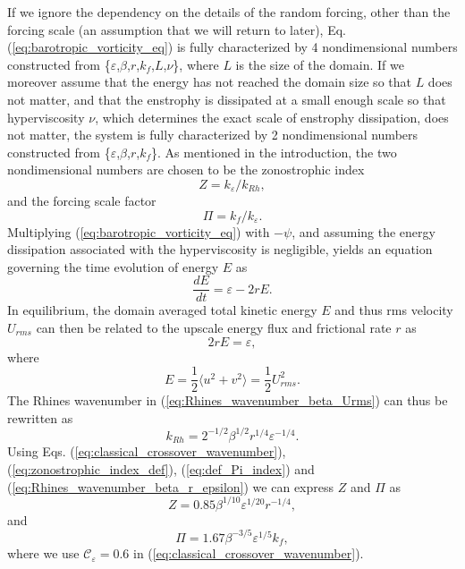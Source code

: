 \documentclass{jfm}
\begin{document}
If we ignore the dependency on the details of the random forcing, other than the forcing scale 
(an assumption that we will return to later), Eq. (\ref{eq:barotropic_vorticity_eq})
is fully characterized by 4 nondimensional
numbers constructed from \{$\varepsilon$,$\beta$,$r$,$k_{f}$,$L$,$\nu$\},
where $L$ is the size of the domain. If we moreover assume that the energy has
not reached the domain size so that $L$ does not matter, and that the
enstrophy is dissipated at a small enough scale so that hyperviscosity
$\nu$, which determines the exact scale of enstrophy dissipation,
does not matter, the system is fully characterized
by 2 nondimensional numbers constructed from \{$\varepsilon$,$\beta$,$r$,$k_{f}$\}.
As mentioned in the introduction, the two nondimensional numbers
are chosen to be the zonostrophic index 
\[
Z=k_{\varepsilon}/k_{Rh},
\]
and the forcing scale factor
\[
\Pi=k_{f}/k_{\varepsilon}.
\]
Multiplying (\ref{eq:barotropic_vorticity_eq}) with $-\psi$, and assuming the energy dissipation
associated with the hyperviscosity is negligible, yields
an equation governing the time evolution of energy $E$ as
\begin{equation}
\frac{dE}{dt}=\varepsilon-2rE.\label{eq:energy_evolution_equation}
\end{equation}
In equilibrium, the domain averaged total kinetic energy $E$ and
thus rms velocity $U_{rms}$ can then be related to the upscale energy flux
and frictional rate $r$ as
\[
2rE=\varepsilon,
\]
where 
\[
E=\frac{1}{2}\langle u^{2}+v^{2}\rangle=\frac{1}{2}U_{rms}^{2}.
\]
The Rhines wavenumber in (\ref{eq:Rhines_wavenumber_beta_Urms}) can thus
be rewritten as
\begin{equation}
k_{Rh}=2^{-1/2}\beta^{1/2}r^{1/4}\varepsilon^{-1/4}.\label{eq:Rhines_wavenumber_beta_r_epsilon}
\end{equation}
Using Eqs. (\ref{eq:classical_crossover_wavenumber}), (\ref{eq:zonostrophic_index_def}), 
(\ref{eq:def_Pi_index}) and (\ref{eq:Rhines_wavenumber_beta_r_epsilon}) we can express $Z$ and $\Pi$ as
\begin{equation}
Z=0.85\beta^{1/10}\varepsilon^{1/20}r^{-1/4},\label{eq:Z_estimate_in_work}
\end{equation}
and
\begin{equation}
\Pi=1.67\beta^{-3/5}\varepsilon^{1/5}k_{f},\label{eq:PI_estimate_in_work}
\end{equation}
where we use $\mathcal{\mathcal{C}_{\varepsilon}}=0.6$ in (\ref{eq:classical_crossover_wavenumber}).
\end{document}
